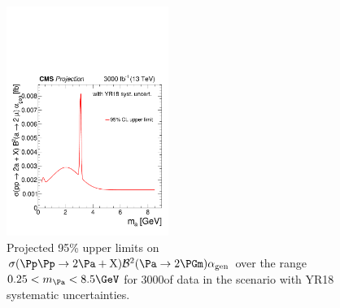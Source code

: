 \begin{figure}
\centering
\includegraphics[width=0.47\textwidth]{plots/nmssm_plots_scenario_2/limit_CSxBR2xAlpha_fb_vs_mGammaD_3000.pdf}
\caption{Projected 95\% \CL upper limits on ${\sigma(\Pp\Pp \to 2 \Pa + \PX)  \mathcal{B}^2 (\Pa \to 2\PGm)  \alphaGen}$ over the range ${0.25 < \MPa < 8.5\GeV}$ for 3000\fbinv of data in the scenario with YR18 systematic uncertainties.}
\label{fig:my_label1}
\end{figure}

